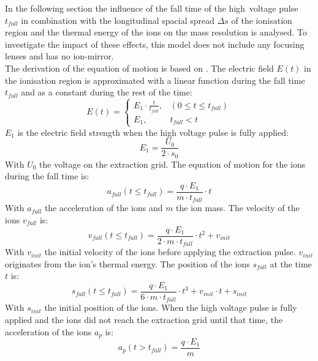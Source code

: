 	In the following section the influence of the fall time of the high~voltage pulse $t_{fall}$ in combination with the longitudinal spacial spread $\Delta s$ of the ionisation region and the thermal energy of the ions on the mass resolution is analysed. To investigate the impact of these effects, this model does not include any focusing lenses and has no ion-mirror.\\
	The derivation of the equation of motion is based on \cite{Diss_Abplanalp}. The electric field $E(t)$ in the ionisation region is approximated with a linear function during the fall time $t_{fall}$ and as a constant during the rest of the time:
	\begin{equation}
		E(t) =
		\begin{cases}
			E_1\cdot\frac{t}{t_{fall}},& (0\leq t\leq t_{fall})\\
			E_1,& t_{fall} < t
		\end{cases}
	\label{eq:PulseEt}
	\end{equation}
	$E_1$ is the electric field strength when the high voltage pulse is fully applied:
	\begin{equation}
		E_1 = \frac{U_0}{2\cdot s_0}
	\end{equation}
	With $U_0$ the voltage on the extraction grid. The equation of motion for the ions during the fall time is:
	\begin{equation}
		a_{fall}(t\leq t_{fall}) = \frac{q\cdot E_1}{m\cdot t_{fall}}\cdot t
		\label{eq:afall}
	\end{equation}
	With $a_{fall}$ the acceleration of the ions and $m$ the ion mass. The velocity of the ions $v_{fall}$ is:
	\begin{equation}
		v_{fall}(t\leq t_{fall}) = \frac{q\cdot E_1}{2\cdot m\cdot t_{fall}}\cdot t^2 + v_{init}\label{eq:vfall}
	\end{equation}
	With $v_{init}$ the initial velocity of the ions before applying the extraction pulse. $v_{init}$ originates from the ion's thermal energy. The position of the ions $s_{fall}$ at the time $t$ is:
	\begin{equation}
		s_{fall}(t\leq t_{fall}) = \frac{q\cdot E_1}{6\cdot m\cdot t_{fall}}\cdot t^3 + v_{init}\cdot t + s_{init}
		\label{eq:sfall}
	\end{equation}
	With $s_{init}$ the initial position of the ions. When the high voltage pulse is fully applied and the ions did not reach the extraction grid until that time, the acceleration of the ions $a_{p}$ is:
	\begin{equation}
		a_{p}(t > t_{fall}) = \frac{q\cdot E_1}{m}
		\label{eq:ap}
	\end{equation}
